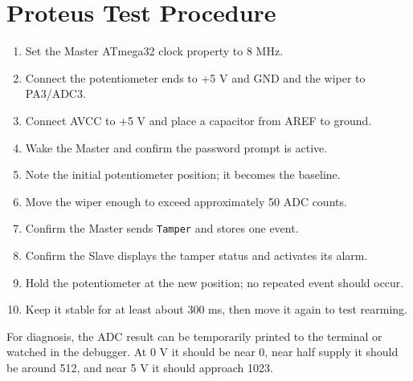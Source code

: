 \documentclass[11pt,a4paper]{article}
\begin{document}
\section{Proteus Test Procedure}
\begin{enumerate}
  \item Set the Master ATmega32 clock property to 8 MHz.
  \item Connect the potentiometer ends to +5 V and GND and the wiper to PA3/ADC3.
  \item Connect AVCC to +5 V and place a capacitor from AREF to ground.
  \item Wake the Master and confirm the password prompt is active.
  \item Note the initial potentiometer position; it becomes the baseline.
  \item Move the wiper enough to exceed approximately 50 ADC counts.
  \item Confirm the Master sends \texttt{Tamper} and stores one event.
  \item Confirm the Slave displays the tamper status and activates its alarm.
  \item Hold the potentiometer at the new position; no repeated event should occur.
  \item Keep it stable for at least about 300 ms, then move it again to test rearming.
\end{enumerate}

For diagnosis, the ADC result can be temporarily printed to the terminal or watched in the debugger. At 0 V it should be near 0, near half supply it should be around 512, and near 5 V it should approach 1023.
\end{document}
